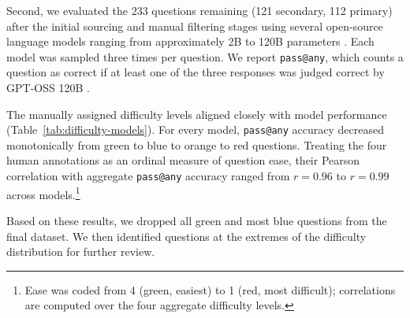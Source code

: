 \documentclass[11pt]{article}
\newcommand{\mhcomment}[1]{\textcolor{blue}{\bf \small [ #1 --MH]}}
\begin{document}


Second, we evaluated the 233 questions remaining (121 secondary, 112 primary) after the initial sourcing and manual filtering stages using several open-source language models ranging from approximately 2B to 120B parameters \cite{gemmateam2026gemma4technicalreport, openai2025gptoss, chandiramani2026nemotron}. Each model was sampled three times per question. We report \texttt{pass@any}, which counts a question as correct if at least one of the three responses was judged correct by GPT-OSS 120B \cite{openai2025gptoss}.

The manually assigned difficulty levels aligned closely with model performance
(Table~\ref{tab:difficulty-models}). For every model, \texttt{pass@any} accuracy decreased monotonically from green to blue to orange to red questions. Treating the four human annotations as an ordinal measure of question ease, their Pearson correlation with aggregate \texttt{pass@any} accuracy ranged from $r=0.96$ to $r=0.99$ across models.\footnote{Ease was coded from 4 (green, easiest) to 1 (red, most difficult);
correlations are computed over the four aggregate difficulty levels.}





Based on these results, we dropped all green and most blue questions from the final dataset. We then identified questions at the extremes of the difficulty distribution for further review.
\end{document}
